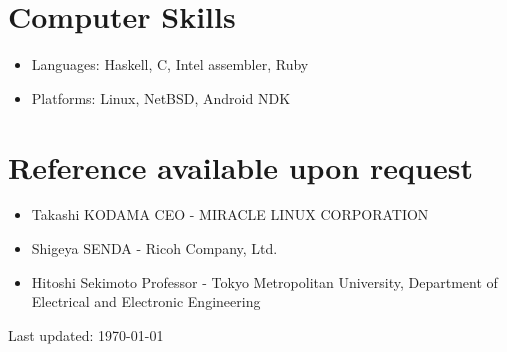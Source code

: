 \documentclass[letterpaper]{article}
\def\footer{
  \begin{center}
    \begin{footnotesize}
      Last updated: \today
    \end{footnotesize}
  \end{center}
}
\begin{document}
\section*{Computer Skills}

\begin{itemize}
  \item Languages: Haskell, C, Intel assembler, Ruby
  \item Platforms: Linux, NetBSD, Android NDK
\end{itemize}

\section*{Reference available upon request}

\begin{itemize}
  \item Takashi KODAMA CEO - MIRACLE LINUX CORPORATION
  \item Shigeya SENDA - Ricoh Company, Ltd.
  \item Hitoshi Sekimoto Professor - Tokyo Metropolitan University, Department of Electrical and Electronic Engineering
\end{itemize}

\bigskip
\footer
\end{document}
